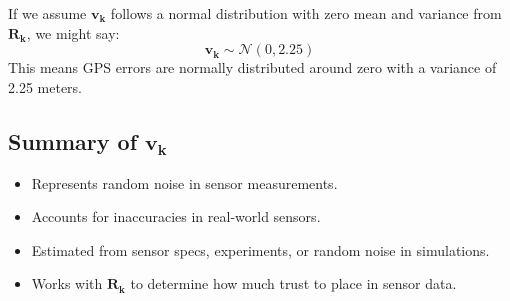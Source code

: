\documentclass{article}
\begin{document}
If we assume \(\mathbf{v_k}\) follows a normal distribution with zero mean and variance from \(\mathbf{R_k}\), we might say:
\[
\mathbf{v_k} \sim \mathcal{N}(0, 2.25)
\]
This means GPS errors are normally distributed around zero with a variance of 2.25 meters.

\subsection*{Summary of \(\mathbf{v_k}\)}
\begin{itemize}
    \item Represents random noise in sensor measurements.
    \item Accounts for inaccuracies in real-world sensors.
    \item Estimated from sensor specs, experiments, or random noise in simulations.
    \item Works with \(\mathbf{R_k}\) to determine how much trust to place in sensor data.
\end{itemize}

\newpage
\end{document}
